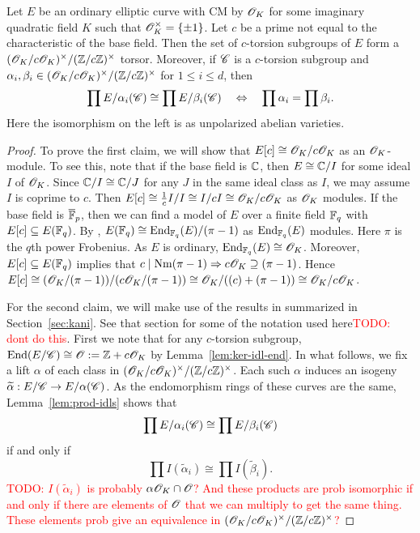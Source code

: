\documentclass{amsart}
\begin{document}
\begin{lemma}
  Let $E$ be an ordinary elliptic curve with CM by $\mathscr{O}_K$ for some imaginary quadratic field $K$ such that $\mathscr{O}_K^\times = \{\pm 1\}$. Let $c$ be a prime not equal to the characteristic of the base field. Then the set of $c$-torsion subgroups of $E$ form a $(\mathscr{O}_K/c\mathscr{O}_K)^\times/(\mathbb{Z}/c\mathbb{Z})^\times$ torsor. Moreover, if $\mathscr{C}$ is a $c$-torsion subgroup and $\alpha_i, \beta_i \in (\mathscr{O}_K/c\mathscr{O}_K)^\times/(\mathbb{Z}/c\mathbb{Z})^\times$ for $1 \leq i \leq d$, then
  \[
    \prod E/\alpha_i(\mathscr{C})
    \cong
    \prod E/\beta_i(\mathscr{C})
    \quad\Leftrightarrow\quad
    \prod \alpha_i = \prod \beta_i.
  \]
  Here the isomorphism on the left is as unpolarized abelian varieties.
\end{lemma}
\begin{proof}
  To prove the first claim, we will show that $E[c] \cong \mathscr{O}_K/c\mathscr{O}_K$ as an $\mathscr{O}_K$-module. To see this, note that if the base field is $\mathbb{C}$, then $E \cong \mathbb{C}/I$ for some ideal $I$ of $\mathscr{O}_K$. Since $\mathbb{C}/I \cong \mathbb{C}/J$ for any $J$ in the same ideal class as $I$, we may assume $I$ is coprime to $c$. Then $E[c] \cong \frac{1}{c}I/I \cong I/cI \cong \mathscr{O}_K/c\mathscr{O}_K$ as $\mathscr{O}_K$ modules. If the base field is $\overline{\mathbb{F}}_p$, then we can find a model of $E$ over a finite field $\mathbb{F}_q$ with $E[c] \subseteq E(\mathbb{F}_q)$. By \cite[Thm.~1]{complex1996lenstra}, $E(\mathbb{F}_q) \cong \operatorname{End}_{\mathbb{F}_q}(E) / (\pi - 1)$ as $\operatorname{End}_{\mathbb{F}_q}(E)$ modules. Here $\pi$ is the $q$th power Frobenius. As $E$ is ordinary, $\operatorname{End}_{\mathbb{F}_q}(E) \cong \mathscr{O}_K$. Moreover, $E[c] \subseteq E(\mathbb{F}_q)$ implies that $c \mid \operatorname{Nm}(\pi - 1) \Rightarrow c\mathscr{O}_K \supseteq (\pi - 1)$. Hence $E[c] \cong (\mathscr{O}_K/(\pi - 1))/(c\mathscr{O}_K/(\pi - 1)) \cong \mathscr{O}_K/((c) + (\pi - 1)) \cong \mathscr{O}_K/c\mathscr{O}_K$.

  For the second claim, we will make use of the results in \cite{kani2011products} summarized in Section~\ref{sec:kani}. See that section for some of the notation used here\textcolor{red}{TODO: dont do this}. First we note that for any $c$-torsion subgroup, $\operatorname{End}(E/\mathscr{C}) \cong \mathscr{O} := \mathbb{Z} + c\mathscr{O}_K$ by Lemma~\ref{lem:ker-idl-end}. In what follows, we fix a lift $\alpha$ of each class in $(\mathscr{O}_K/c\mathscr{O}_K)^\times/(\mathbb{Z}/c\mathbb{Z})^\times$.  Each such $\alpha$ induces an isogeny $\widetilde{\alpha}: E/\mathscr{C} \to E/\alpha(\mathscr{C})$. As the endomorphism rings of these curves are the same, Lemma~\ref{lem:prod-idls} shows that
  \[
    \prod E/\alpha_i(\mathscr{C}) \cong \prod E/\beta_i(\mathscr{C})
  \]
  if and only if
  \[
    \prod I(\tilde{\alpha}_i) \cong \prod I(\tilde{\beta}_i).
  \]
  \textcolor{red}{TODO: $I(\tilde{\alpha}_i)$ is probably $\alpha\mathscr{O}_K \cap \mathscr{O}$? And these products are prob isomorphic if and only if there are elements of $\mathscr{O}$ that we can multiply to get the same thing. These elements prob give an equivalence in $(\mathscr{O}_K/c\mathscr{O}_K)^\times/(\mathbb{Z}/c\mathbb{Z})^\times$?}


\end{proof}
\end{document}
